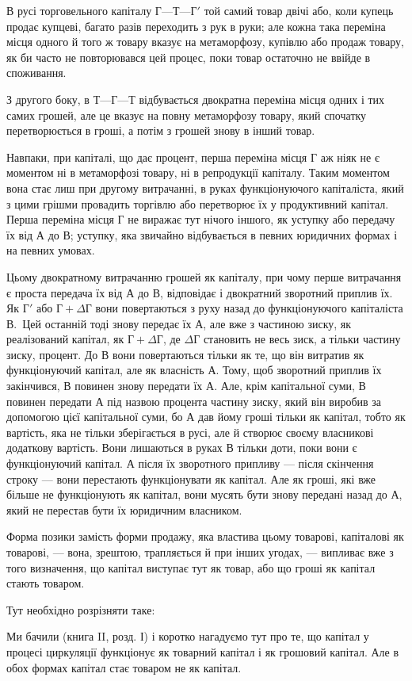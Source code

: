 
В русі торговельного капіталу $Г — Т — Г'$ той самий товар
двічі або, коли купець продає купцеві, багато разів переходить
з рук в руки; але кожна така переміна місця одного й того ж
товару вказує на метаморфозу, купівлю або продаж товару,
як би часто не повторювався цей процес, поки товар остаточно
не ввійде в споживання.

З другого боку, в $Т — Г — Т$ відбувається двократна переміна
місця одних і тих самих грошей, але це вказує на повну
метаморфозу товару, який спочатку перетворюється в гроші,
а потім з грошей знову в інший товар.

Навпаки, при капіталі, що дає процент, перша переміна місця
$Г$ аж ніяк не є моментом ні в метаморфозі товару, ні в репродукції
капіталу. Таким моментом вона стає лиш при другому
витрачанні, в руках функціонуючого капіталіста, який з цими
грішми провадить торгівлю або перетворює їх у продуктивний
капітал. Перша переміна місця $Г$ не виражає тут нічого іншого,
як уступку або передачу їх від $А$ до $В$; уступку, яка звичайно
відбувається в певних юридичних формах і на певних умовах.

Цьому двократному витрачанню грошей як капіталу, при
чому перше витрачання є проста передача їх від $А$ до $В$, відповідає
і двократний зворотний приплив їх. Як $Г'$ або $Г + ΔГ$ вони
повертаються з руху назад до функціонуючого капіталіста В.~Цей останній тоді знову передає їх $А$, але вже з частиною
зиску, як реалізований капітал, як $Г + ΔГ$, де $ΔГ$ становить
не весь зиск, а тільки частину зиску, процент. До $В$ вони повертаються
тільки як те, що він витратив як функціонуючий
капітал, але як власність $А$. Тому, щоб зворотний приплив їх
закінчився, $В$ повинен знову передати їх $А$. Але, крім капітальної
суми, $В$ повинен передати $А$ під назвою процента частину
зиску, який він виробив за допомогою цієї капітальної суми,
бо $А$ дав йому гроші тільки як капітал, тобто як вартість, яка
не тільки зберігається в русі, але й створює своєму власникові
додаткову вартість. Вони лишаються в руках $В$ тільки доти,
поки вони є функціонуючий капітал. А після їх зворотного
припливу — після скінчення строку — вони перестають функціонувати
як капітал. Але як гроші, які вже більше не функціонують
як капітал, вони мусять бути знову передані назад до $А$,
який не перестав бути їх юридичним власником.

Форма позики замість форми продажу, яка властива цьому
товарові, капіталові як товарові, — вона, зрештою, трапляється
й при інших угодах, — випливає вже з того визначення, що
капітал виступає тут як товар, або що гроші як капітал стають
товаром.

Тут необхідно розрізняти таке:

Ми бачили (книга II, розд. І) і коротко нагадуємо тут про те,
що капітал у процесі циркуляції функціонує як товарний капітал
і як грошовий капітал. Але в обох формах капітал стає
товаром не як капітал.
